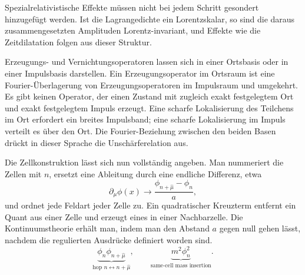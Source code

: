Spezialrelativistische Effekte müssen nicht bei jedem Schritt gesondert hinzugefügt werden. Ist die Lagrangedichte ein Lorentzskalar, so sind die daraus zusammengesetzten Amplituden Lorentz-invariant, und Effekte wie die Zeitdilatation folgen aus dieser Struktur.

\begin{classroomqa}
\end{classroomqa}

Erzeugungs- und Vernichtungsoperatoren lassen sich in einer Ortsbasis oder in einer Impulsbasis darstellen. Ein Erzeugungsoperator im Ortsraum ist eine Fourier-Überlagerung von Erzeugungsoperatoren im Impulsraum und umgekehrt. Es gibt keinen Operator, der einen Zustand mit zugleich exakt festgelegtem Ort und exakt festgelegtem Impuls erzeugt. Eine scharfe Lokalisierung des Teilchens im Ort erfordert ein breites Impulsband; eine scharfe Lokalisierung im Impuls verteilt es über den Ort. Die Fourier-Beziehung zwischen den beiden Basen drückt in dieser Sprache die Unschärferelation aus.

\begin{classroomqa}
\end{classroomqa}

Die Zellkonstruktion lässt sich nun vollständig angeben. Man nummeriert die Zellen mit \(n\), ersetzt eine Ableitung durch eine endliche Differenz, etwa
\begin{equation}
\partial_\mu\phi(x)
\longrightarrow
\frac{\phi_{n+\hat\mu}-\phi_n}{a},
\end{equation}
und ordnet jede Feldart jeder Zelle zu. Ein quadratischer Kreuzterm entfernt ein Quant aus einer Zelle und erzeugt eines in einer Nachbarzelle. Die Kontinuumstheorie erhält man, indem man den Abstand \(a\) gegen null gehen lässt, nachdem die regulierten Ausdrücke definiert worden sind.
\begin{equation}
\underbrace{\phi_n\phi_{n+\hat\mu}}_{\text{hop }n\leftrightarrow n+\hat\mu},
\qquad
\underbrace{m^2\phi_n^2}_{\text{same-cell mass insertion}}.
\end{equation}

